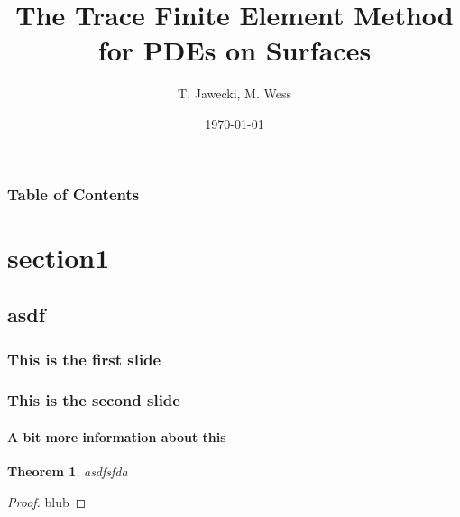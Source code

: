 \documentclass[11pt]{beamer}
\title{\textbf{The Trace Finite Element Method for PDEs on Surfaces}}
\author{T. Jawecki, M. Wess}
\date{\today}
\theoremstyle{plain}
\newtheorem{thm}{Theorem}[section]
\theoremstyle{definition}
\theoremstyle{remark}
\begin{document}
\frame{\titlepage}

\begin{frame}
	\frametitle{Table of Contents}
	\tableofcontents
\end{frame}

\section{section1}
\subsection{asdf}
\begin{frame}
    \frametitle{This is the first slide}
\end{frame}
\begin{frame}
    \frametitle{This is the second slide}
    \framesubtitle{A bit more information about this}
	\begin{thm}
	asdfsfda
	\end{thm}
	\begin{proof}
	blub
	\end{proof}
\end{frame}
\end{document}
